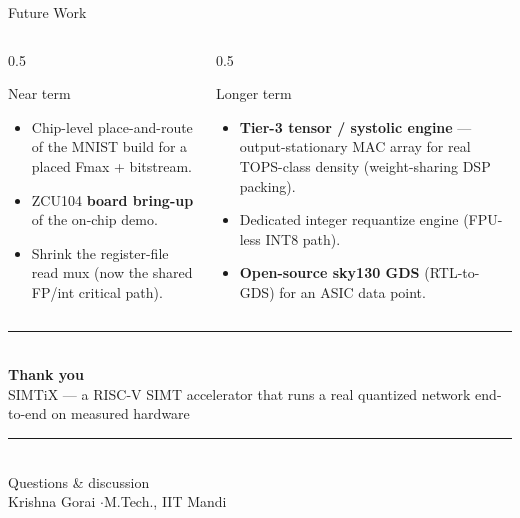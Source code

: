 \documentclass[aspectratio=169,11pt]{beamer}
\newcommand{\hl}[1]{{\color{simtixaccent}\textbf{#1}}}
\begin{document}
\begin{frame}{Future Work}
  \begin{columns}[T]
    \begin{column}{0.5\textwidth}
      \begin{block}{Near term}
        \small
        \begin{itemize}
          \item Chip-level place-and-route of the MNIST build for a placed Fmax + bitstream.
          \item ZCU104 \hl{board bring-up} of the on-chip demo.
          \item Shrink the register-file read mux (now the shared FP/int critical path).
        \end{itemize}
      \end{block}
    \end{column}
    \begin{column}{0.5\textwidth}
      \begin{block}{Longer term}
        \small
        \begin{itemize}
          \item \hl{Tier-3 tensor / systolic engine} --- output-stationary MAC array for real
            TOPS-class density (weight-sharing DSP packing).
          \item Dedicated integer requantize engine (FPU-less INT8 path).
          \item \hl{Open-source sky130 GDS} (RTL-to-GDS) for an ASIC data point.
        \end{itemize}
      \end{block}
    \end{column}
  \end{columns}
\end{frame}

{
\begin{frame}[plain]
  \vspace{1.4cm}
  \begin{center}
    {\color{simtixaccent}\rule{0.8\textwidth}{1.0pt}}\\[0.8em]
    {\Huge\bfseries\color{simtixblue} Thank you}\\[0.7em]
    {\large\color{simtixblue} SIMTiX --- a RISC-V SIMT accelerator that runs a real
     quantized network end-to-end on measured hardware}\\[0.7em]
    {\color{simtixaccent}\rule{0.8\textwidth}{1.0pt}}\\[1.2em]
    {\normalsize Questions \& discussion}\\[0.6em]
    {\footnotesize Krishna Gorai \quad$\cdot$\quad M.Tech., IIT Mandi}
  \end{center}
\end{frame}
}
\end{document}
